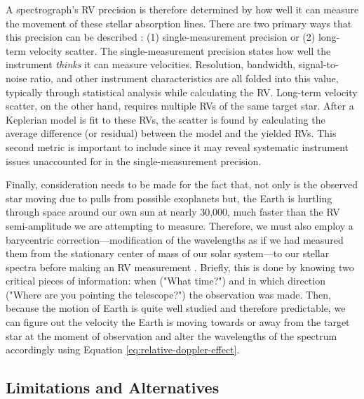 A spectrograph's RV precision is therefore determined by how well it can measure the movement of these stellar absorption lines. There are two primary ways that this precision can be described \citep{fischer_state_2016}: (1) single-measurement precision or (2) long-term velocity scatter. The single-measurement precision states how well the instrument \textit{thinks} it can measure velocities. Resolution, bandwidth, signal-to-noise ratio, and other instrument characteristics are all folded into this value, typically through statistical analysis while calculating the RV. Long-term velocity scatter, on the other hand, requires multiple RVs of the same target star. After a Keplerian model is fit to these RVs, the scatter is found by calculating the average difference (or residual) between the model and the yielded RVs. This second metric is important to include since it may reveal systematic instrument issues unaccounted for in the single-measurement precision.

Finally, consideration needs to be made for the fact that, not only is the observed star moving due to pulls from possible exoplanets but, the Earth is hurtling through space around our own sun at nearly 30,000\ms, much faster than the RV semi-amplitude we are attempting to measure. Therefore, we must also employ a barycentric correction---modification of the wavelengths as if we had measured them from the stationary center of mass of our solar system---to our stellar spectra before making an RV measurement \citep{wright_barycentric_2014}. Briefly, this is done by knowing two critical pieces of information: when ("What time?") and in which direction ("Where are you pointing the telescope?") the observation was made. Then, because the motion of Earth is quite well studied and therefore predictable, we can figure out the velocity the Earth is moving towards or away from the target star at the moment of observation and alter the wavelengths of the spectrum accordingly using Equation \ref{eq:relative-doppler-effect}.

\subsection{Limitations and Alternatives}

